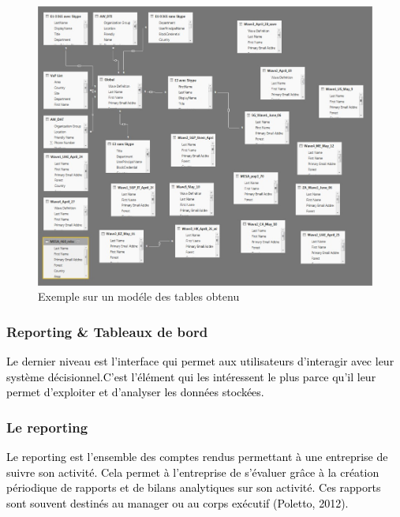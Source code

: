 \documentclass[a4paper,12pt]{report}
\begin{document}
\begin{figure}[H]
	\begin{center}
		\includegraphics[width=1\linewidth]{Projet_O365/modele}
\end{center}
	\caption{Exemple sur un modéle des tables obtenu}
	\label{fig:18}	
\end{figure}


\subsubsection{Reporting \& Tableaux de bord }

\textcolor{black}{Le dernier niveau est l’interface qui permet aux utilisateurs d’interagir avec leur système décisionnel.C’est l’élément qui les intéressent le plus parce qu’il leur permet d’exploiter et d’analyser les données
stockées.}

\subsubsection*{Le reporting }

\textcolor{black}{Le reporting est l’ensemble des comptes rendus permettant à une entreprise de suivre son activité.
Cela permet à l’entreprise de s’évaluer grâce à la création périodique de rapports et de bilans analytiques
sur son activité. Ces rapports sont souvent destinés au manager ou au corps exécutif (Poletto, 2012).}
\end{document}

